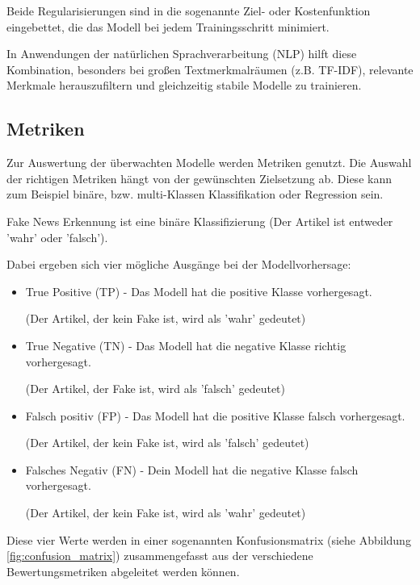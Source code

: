 Beide Regularisierungen sind in die sogenannte Ziel- oder Kostenfunktion eingebettet, die das Modell bei jedem Trainingsschritt minimiert. 

In Anwendungen der natürlichen Sprachverarbeitung (NLP) hilft diese Kombination, besonders bei großen Textmerkmalräumen (z.B. TF-IDF), 
relevante Merkmale herauszufiltern und gleichzeitig stabile Modelle zu trainieren\cite{chen2016xgboost}.


\subsection{Metriken}

Zur Auswertung der überwachten Modelle werden Metriken genutzt. Die Auswahl der richtigen Metriken hängt von der gewünschten Zielsetzung ab.
Diese kann zum Beispiel binäre, bzw. multi-Klassen Klassifikation oder Regression sein.

Fake News Erkennung ist eine binäre Klassifizierung (Der Artikel ist entweder 'wahr' oder 'falsch').

Dabei ergeben sich vier mögliche Ausgänge bei der Modellvorhersage:
\begin{itemize}
    \item True Positive (TP) - Das Modell hat die positive Klasse vorhergesagt. 
        
    (Der Artikel, der kein Fake ist, wird als 'wahr' gedeutet)
    \item True Negative (TN) - Das Modell hat die negative Klasse richtig vorhergesagt.
        
    (Der Artikel, der Fake ist, wird als 'falsch' gedeutet)
    \item Falsch positiv (FP) - Das Modell hat die positive Klasse falsch vorhergesagt. 
        
    (Der Artikel, der kein Fake ist, wird als 'falsch' gedeutet)
    \item Falsches Negativ (FN) - Dein Modell hat die negative Klasse falsch vorhergesagt. 
        
    (Der Artikel, der kein Fake ist, wird als 'wahr' gedeutet)
\end{itemize}

Diese vier Werte werden in einer sogenannten Konfusionsmatrix  (siehe Abbildung \ref{fig:confusion_matrix}) zusammengefasst
aus der verschiedene Bewertungsmetriken abgeleitet werden können.

